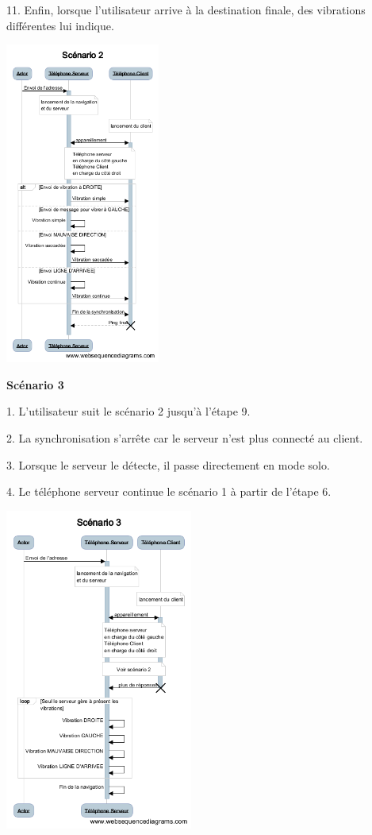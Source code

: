 {11. Enfin, lorsque l'utilisateur arrive à la destination finale, des vibrations différentes lui indique.

\begin{center}
\includegraphics[height=400px]{Assets/scenario2.png}
\end{center}

\textbf{Scénario 3}

1. L'utilisateur suit le scénario 2 jusqu'à l'étape 9.

2. La synchronisation s'arrête car le serveur n'est plus connecté au client.

3. Lorsque le serveur le détecte, il passe directement en mode solo.

4. Le téléphone serveur continue le scénario 1 à partir de l'étape 6. 

\begin{center}
\includegraphics[height=400px]{Assets/scenario3.png}
\end{center}

}
